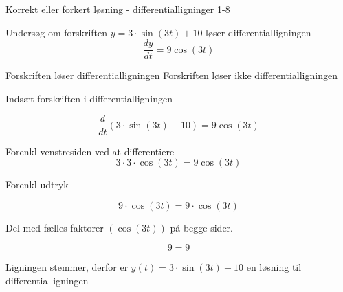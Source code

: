 \documentclass{article}
\begin{document}
\begin{exercise}{Korrekt eller forkert løsning - differentialligninger 1-8}
	
	
	Undersøg om forskriften $y = 3 \cdot \sin(3t) + 10$ løser differentialligningen
	\[
	\frac{dy}{dt} = 9 \cos(3t)
	\]
	
\begin{multichoice}
	\itemtrue Forskriften løser differentialligningen 
	\itemfalse Forskriften løser ikke differentialligningen 
\end{multichoice}
	
	\hint
	
	Indsæt forskriften i differentialligningen
	
	\hint
	\[
	\frac{d}{dt} \left( 3 \cdot \sin(3t) + 10 \right) = 9 \cos(3t)
	\]
	
	
	\hint
	
	Forenkl venstresiden ved at differentiere
	\[
	3 \cdot 3 \cdot \cos(3t) = 9 \cos(3t)
	\]
	
	\hint
	
	Forenkl udtryk 
	
	\hint
	\[
	9 \cdot \cos(3t) = 9 \cdot \cos(3t)
	\]
	
	\hint
	Del med fælles faktorer $\left( \cos(3t) \right)$ på begge sider.
	
	\hint
	
	\[
	9 = 9
	\]
	
	
	\hint
	
	Ligningen stemmer, derfor er $y(t) = 3 \cdot \sin(3t) + 10$ en løsning til differentialligningen
	
\end{exercise}

\newpage
\end{document}
